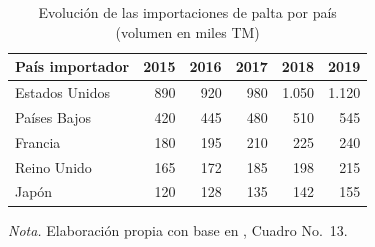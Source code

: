 \begin{table}[H]
\centering
\caption{Evoluci\'on de las importaciones de palta por pa\'is (volumen en miles TM)}
\label{tab:importaciones_pais}
\small
\begin{tabular}{lrrrrr}
\toprule
\textbf{Pa\'is importador} & \textbf{2015} & \textbf{2016} & \textbf{2017} & \textbf{2018} & \textbf{2019} \\
\midrule
Estados Unidos & 890 & 920 & 980 & 1.050 & 1.120 \\
Pa\'ises Bajos  & 420 & 445 & 480 & 510 & 545 \\
Francia         & 180 & 195 & 210 & 225 & 240 \\
Reino Unido     & 165 & 172 & 185 & 198 & 215 \\
Jap\'on          & 120 & 128 & 135 & 142 & 155 \\
\bottomrule
\end{tabular}
\parbox{0.94\textwidth}{\small \textit{Nota.} Elaboraci\'on propia con base en \citep{SierraSelva2020}, Cuadro No.~13.}
\end{table}

